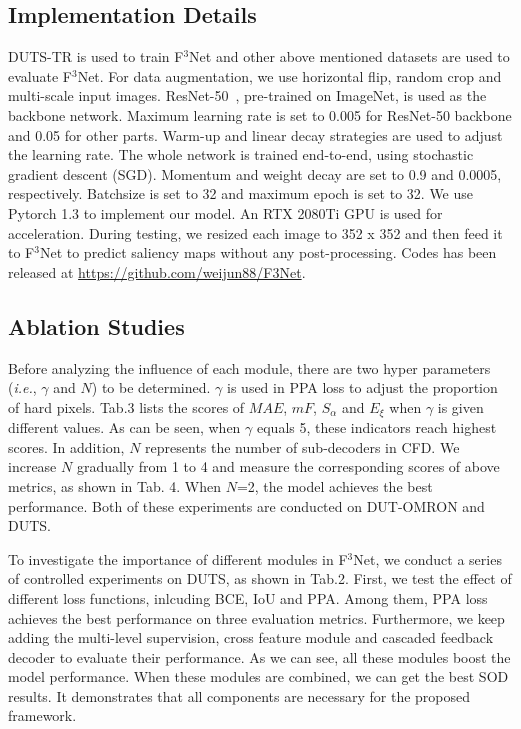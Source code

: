 \documentclass[letterpaper]{article} %
\begin{document}
\subsection{Implementation Details}
DUTS-TR is used to train F$^3$Net and other above mentioned datasets are used to evaluate F$^3$Net. For data augmentation, we use horizontal flip, random crop and multi-scale input images. ResNet-50~\cite{Resnet}, pre-trained on ImageNet, is used as the backbone network. Maximum learning rate is set to 0.005 for ResNet-50 backbone and 0.05 for other parts. Warm-up and linear decay strategies are used to adjust the learning rate. The whole network is trained end-to-end, using stochastic gradient descent (SGD). Momentum and weight decay are set to 0.9 and 0.0005, respectively. Batchsize is set to 32 and maximum epoch is set to 32. We use Pytorch 1.3 to implement our model. An RTX 2080Ti GPU is used for acceleration. During testing, we resized each image to 352 x 352 and then feed it to F$^3$Net to predict saliency maps without any post-processing. Codes has been released at \url{https://github.com/weijun88/F3Net}.

\subsection{Ablation Studies}
Before analyzing the influence of each module, there are two hyper parameters ({\it i.e.}, $\gamma$ and $N$) to be determined. $\gamma$ is used in PPA loss to adjust the proportion of hard pixels. Tab.3 lists the scores of $MAE$, $mF$, $S_\alpha$ and $E_\xi$ when $\gamma$ is given different values. As can be seen, when $\gamma$ equals 5, these indicators reach highest scores. In addition, $N$ represents the number of sub-decoders in CFD. We increase $N$ gradually from 1 to 4 and measure the corresponding scores of above metrics, as shown in Tab. 4. When $N$=2, the model achieves the best performance. Both of these experiments are conducted on DUT-OMRON and DUTS.

To investigate the importance of different modules in F$^3$Net, we conduct a series of controlled experiments on DUTS, as shown in Tab.2. First, we test the effect of different loss functions, inlcuding BCE, IoU and PPA. Among them, PPA loss achieves the best performance on three evaluation metrics. Furthermore, we keep adding the multi-level supervision, cross feature module and cascaded feedback decoder to evaluate their performance. As we can see, all these modules boost the model performance. When these modules are combined, we can get the best SOD results. It demonstrates that all components are necessary for the proposed framework.
\end{document}
